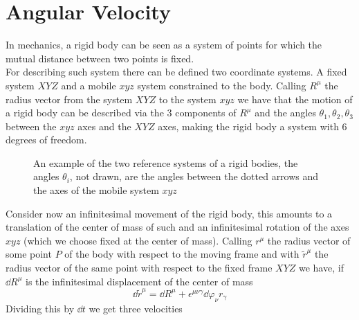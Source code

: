 \documentclass[../admech.tex]{subfiles}
\begin{document}
\section{Angular Velocity}
\begin{dfn}
	In mechanics, a rigid body can be seen as a system of points for which the mutual distance between two points is fixed.\\
	For describing such system there can be defined two coordinate systems. A fixed system $XYZ$ and a mobile $xyz$ system constrained to the body. Calling $R^\mu$ the radius vector from the system $XYZ$ to the system $xyz$ we have that the motion of a rigid body can be described via the 3 components of $R^\mu$ and the angles $\theta_1,\theta_2,\theta_3$ between the $xyz$ axes and the $XYZ$ axes, making the rigid body a system with 6 degrees of freedom.
\end{dfn}
\begin{figure}[H]
	\centering
	\caption{An example of the two reference systems of a rigid bodies, the angles $\theta_i$, not drawn, are the angles between the dotted arrows and the axes of the mobile system $xyz$}
	\label{fig:rigidbodyaxes}
\end{figure}
Consider now an infinitesimal movement of the rigid body, this amounts to a translation of the center of mass of such and an infinitesimal rotation of the axes $xyz$ (which we choose fixed at the center of mass). Calling $r^\mu$ the radius vector of some point $P$ of the body with respect to the moving frame and with $\tilde{r}^\mu$ the radius vector of the same point with respect to the fixed frame $XYZ$ we have, if $\dd R^\mu$ is the infinitesimal displacement of the center of mass
\begin{equation}
	\dd\tilde{r}^\mu=\dd R^\mu+\epsilon^{\mu\nu\gamma}\dd\varphi_\nu r_\gamma
	\label{eq:infdispmov}
\end{equation}
Dividing this by $\dd t$ we get three velocities
\end{document}
